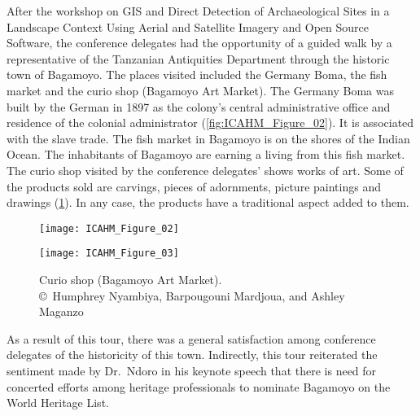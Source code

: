 
After the workshop on GIS and Direct Detection of Archaeological Sites in a Landscape Context Using Aerial and Satellite Imagery and Open Source Software, the conference delegates had the opportunity of a guided walk by a representative of the Tanzanian Antiquities Department through the historic town of Bagamoyo. The places visited included the Germany Boma, the fish market and the curio shop (Bagamoyo Art Market). The Germany Boma was built by the German in 1897 as the colony’s central administrative office and residence of the colonial administrator (\cref{fig:ICAHM_Figure_02}). It is associated with the slave trade. The fish market in Bagamoyo is on the shores of the Indian Ocean. The inhabitants of Bagamoyo are earning a living from this fish market. The curio shop visited by the conference delegates’ shows works of art. Some of the products sold are carvings, pieces of adornments, picture paintings and drawings (\cref{fig:ICAHM_Figure_03}). In any case, the products have a traditional aspect added to them.

\begin{figure}[!tb]
	\begin{minipage}[t]{.49\linewidth}
	\texttt{[image: ICAHM\_Figure\_02]}
	\caption{The Germany Boma.
		{\normalfont\scriptsize \\ \copyright\
			Humphrey Nyambiya, Barpougouni Mardjoua, and Ashley Maganzo %
	}}
	\label{fig:ICAHM_Figure_02}
\end{minipage}
\hfill
	\begin{minipage}[t]{.49\linewidth}
	\texttt{[image: ICAHM\_Figure\_03]}
	\caption{Curio shop (Bagamoyo Art Market).
		{\normalfont\scriptsize \\ \copyright\
			Humphrey Nyambiya, Barpougouni Mardjoua, and Ashley Maganzo %
	}}
	\label{fig:ICAHM_Figure_03}
	\end{minipage}
\end{figure}

As a result of this tour, there was a general satisfaction among conference delegates of the historicity of this town. Indirectly, this tour reiterated the sentiment made by Dr.~Ndoro in his keynote speech that there is need for concerted efforts among heritage professionals to nominate Bagamoyo on the World Heritage List.

